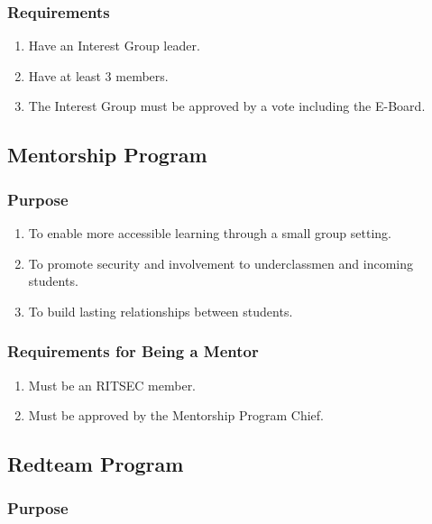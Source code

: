 \documentclass{article}
\begin{document}
\subsubsection{Requirements}

\begin{enumerate}
  \item Have an Interest Group leader.
  \item Have at least 3 members.
  \item The Interest Group must be approved by a vote including the E-Board.
\end{enumerate}

\subsection{Mentorship Program}

\subsubsection{Purpose}

\begin{enumerate}
  \item To enable more accessible learning through a small group setting.
  \item To promote security and involvement to underclassmen and incoming
    students.
  \item To build lasting relationships between students.
\end{enumerate}

\subsubsection{Requirements for Being a Mentor}

\begin{enumerate}
  \item Must be an RITSEC member.
  \item Must be approved by the Mentorship Program Chief.
\end{enumerate}

\subsection{Redteam Program}

\subsubsection{Purpose}
\end{document}
